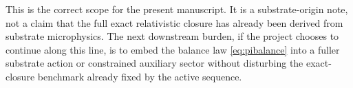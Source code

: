 \documentclass[11pt]{article}
\begin{document}
This is the correct scope for the present manuscript. It is a substrate-origin note, not a claim that the full exact relativistic closure has already been derived from substrate microphysics. The next downstream burden, if the project chooses to continue along this line, is to embed the balance law \eqref{eq:pibalance} into a fuller substrate action or constrained auxiliary sector without disturbing the exact-closure benchmark already fixed by the active sequence.
\end{document}
